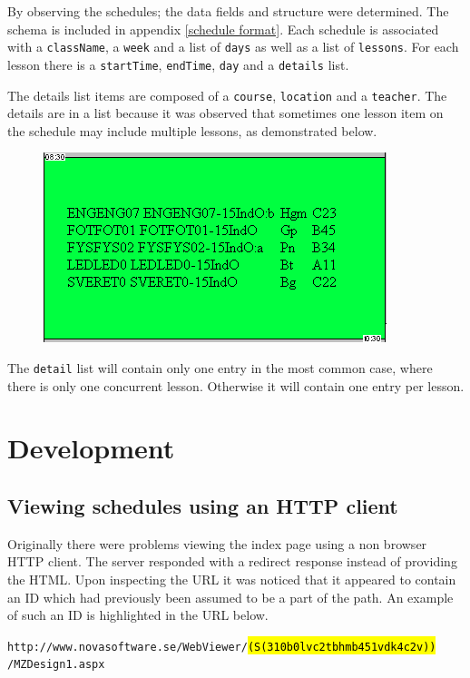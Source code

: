 \documentclass{article}
\begin{document}
	By observing the schedules; the data fields and structure were determined. The schema is included in  appendix \ref{schedule format}. Each schedule is associated with a \texttt{className}, a \texttt{week} and a list of \texttt{days} as well as a list of \texttt{lessons}.
	For each lesson there is a \texttt{startTime}, \texttt{endTime}, \texttt{day} and a \texttt{details} list.
	
	The details list items are composed of a \texttt{course}, \texttt{location} and a \texttt{teacher}. The details are in a list because it was observed that sometimes one lesson item on the schedule may include multiple lessons, as demonstrated below.
	
	\begin{figure}[h]
		\centering
		\includegraphics[width=0.5\linewidth]{images/multiple-lessons}
		\caption{}
		\label{fig:multiple-lessons}
	\end{figure}
	
	The \texttt{detail} list will contain only one entry in the most common case, where there is only one concurrent lesson. Otherwise it will contain one entry per lesson.
	
	\section{Development}
	
	\subsection{Viewing schedules using an HTTP client}
	Originally there were problems viewing the index page using a non browser HTTP client. The server responded with a redirect response instead of providing the HTML. Upon inspecting the URL it was noticed that it appeared to contain an ID which had previously been assumed to be a part of the path. An example of such an ID is highlighted in the URL below.
	
	\texttt{http://www.novasoftware.se/WebViewer/\hl{(S(310b0lvc2tbhmb451vdk4c2v))}\\/MZDesign1.aspx}
	
\end{document}

